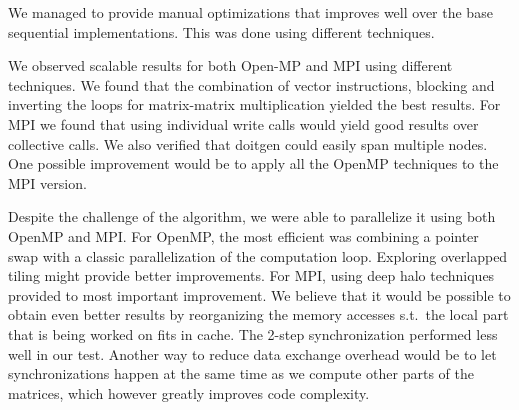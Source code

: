 We managed to provide manual optimizations that improves well over the base sequential implementations. This was done using different techniques.

We observed scalable results for both Open\hyp{}MP and MPI using different techniques. We found that the combination of vector instructions, blocking and inverting the loops for matrix-matrix multiplication yielded the best results. For MPI we found that using individual write calls would yield good results over collective calls. We also verified that doitgen could easily span multiple nodes. One possible improvement would be to apply all the OpenMP techniques to the MPI version.


 Despite the challenge of the algorithm, we were able to parallelize it using both OpenMP and MPI.
For OpenMP, the most efficient was combining a pointer swap with a classic parallelization of the computation loop. Exploring overlapped tiling might provide better improvements.
For MPI, using deep halo techniques provided to most important improvement.
We believe that it would be possible to obtain even better results by reorganizing the memory accesses s.t.~the local part that is being worked on fits in cache.
The 2-step synchronization performed less well in our test.
Another way to reduce data exchange overhead would be to let synchronizations happen at the same time as we compute other parts of the matrices, which however greatly improves code complexity.
